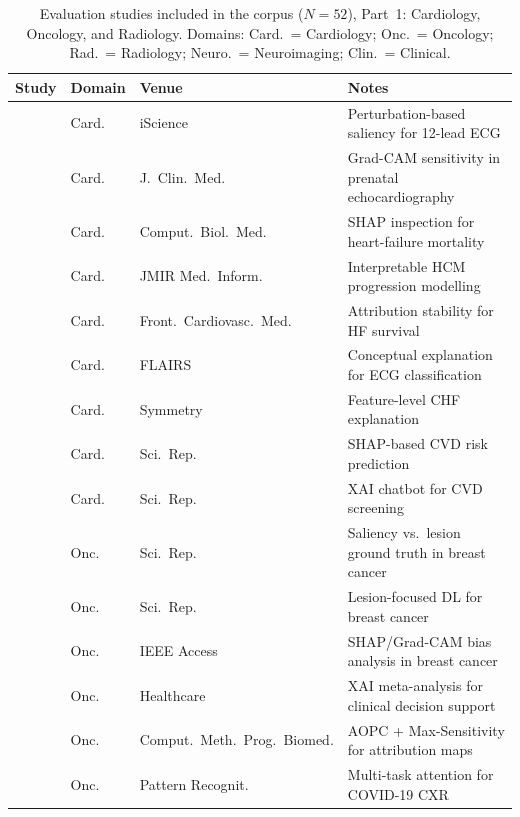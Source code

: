 
\begin{table}[htbp]
\centering
\caption{Evaluation studies included in the corpus ($N = 52$), Part~1: Cardiology, Oncology, and Radiology. Domains: Card.\ = Cardiology; Onc.\ = Oncology; Rad.\ = Radiology; Neuro.\ = Neuroimaging; Clin.\ = Clinical.}
\label{tab:dataset_papers}
\small
\renewcommand{\arraystretch}{1.05}
\begin{tabularx}{\textwidth}{@{}p{1.6cm}p{1.2cm}p{2.8cm}X@{}}
\toprule
\textbf{Study} & \textbf{Domain} & \textbf{Venue} & \textbf{Notes} \\
\midrule
\cite{Zhang2021} & Card. & iScience & Perturbation-based saliency for 12-lead ECG \\
\cite{Nurmaini2022} & Card. & J.\ Clin.\ Med. & Grad-CAM sensitivity in prenatal echocardiography \\
\cite{Vazquez2021} & Card. & Comput.\ Biol.\ Med. & SHAP inspection for heart-failure mortality \\
\cite{Piculin2022} & Card. & JMIR Med.\ Inform. & Interpretable HCM progression modelling \\
\cite{MorenoSanchez2023} & Card. & Front.\ Cardiovasc.\ Med. & Attribution stability for HF survival \\
\cite{Sangroya2022} & Card. & FLAIRS & Conceptual explanation for ECG classification \\
\cite{Li2020} & Card. & Symmetry & Feature-level CHF explanation \\
\cite{shah2025explainable} & Card. & Sci.\ Rep. & SHAP-based CVD risk prediction \\
\cite{muneer2025blockchain} & Card. & Sci.\ Rep. & XAI chatbot for CVD screening \\
\addlinespace[2pt]
\cite{Pertuz2023} & Onc. & Sci.\ Rep. & Saliency vs.\ lesion ground truth in breast cancer \\
\cite{saharan2025explainable} & Onc. & Sci.\ Rep. & Lesion-focused DL for breast cancer \\
\cite{11271656} & Onc. & IEEE Access & SHAP/Grad-CAM bias analysis in breast cancer \\
\cite{abbas2025explainable} & Onc. & Healthcare & XAI meta-analysis for clinical decision support \\
\cite{Patricio2024} & Onc. & Comput.\ Meth.\ Prog.\ Biomed. & AOPC + Max-Sensitivity for attribution maps \\
\cite{sharma2022covidmanet} & Onc. & Pattern Recognit. & Multi-task attention for COVID-19 CXR \\

\end{tabularx}
\end{table}
